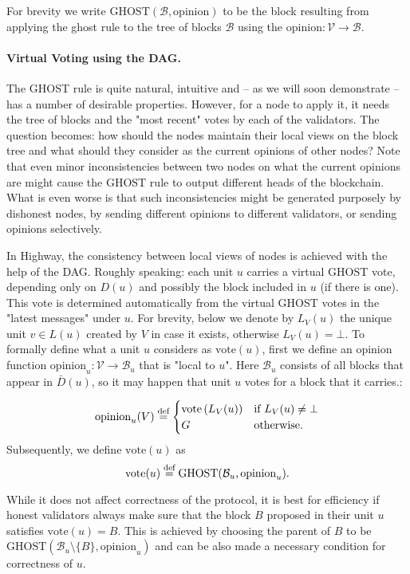 \documentclass[12pt, fleqn]{article}
\newcommand{\vote}{\mathrm{vote}}
\newcommand{\ghost}{\mathrm{GHOST}}
\newcommand{\opinion}{\mathrm{opinion}}
\newcommand{\defeq}{\stackrel{\textup{def}}{=}}
\newcommand{\cB}{\mathcal{B}}
\newcommand{\cV}{\mathcal{V}}
\newcommand{\inparen}[1]{\left(#1\right)}
\begin{document}
For brevity we write $\ghost(\cB, \opinion)$ to be the block resulting from applying the ghost rule to the tree of blocks $\cB$ using the $\opinion:\cV \to \cB$.

\paragraph{Virtual Voting using the DAG.}

The GHOST rule is quite natural, intuitive and -- as we will soon demonstrate -- has a number of desirable properties.
%
However, for a node to apply it, it needs the tree of blocks and the "most recent" votes by each of the validators. 
%
The question becomes: how should the nodes maintain their local views on the block tree and what should they consider as the current opinions of other nodes? 
%
Note that even minor inconsistencies between two nodes on what the current opinions are might cause the GHOST rule to output different heads of the blockchain.
%
What is even worse is that such inconsistencies might be generated purposely by dishonest nodes, by sending different opinions to different validators, or sending opinions selectively.

In Highway, the consistency between local views of nodes is achieved with the help of the DAG.
%
Roughly speaking: each unit $u$ carries a virtual GHOST vote, depending only on $D(u)$ and possibly the block included in $u$ (if there is one). This vote is determined automatically from the virtual GHOST votes in the "latest messages" under $u$.
%
For brevity, below we denote by $L_V(u)$ the unique unit $v\in L(u)$ created by $V$ in case it exists, otherwise $L_V(u)=\bot$.
%
To formally define what a unit $u$ considers as $\vote(u)$, first we define an opinion function $\opinion_u: \cV \to \cB_u$ that is "local to $u$". Here $\cB_u$ consists of all blocks that appear in $\bar{D}(u)$, so it may happen that unit $u$ votes for a block that it carries.:


$$
    \opinion_u(V) \defeq \begin{cases}
    \vote\inparen{L_V(u)} &\mbox{if }  L_V(u)\neq \bot\\
    G &\mbox{otherwise}.
    \end{cases}
$$
Subsequently, we define $\vote(u)$ as
$$\vote(u) \defeq \ghost(\cB_u, \opinion_u).$$

While it does not affect correctness of the protocol, it is best for efficiency if honest validators always make sure that the block $B$ proposed in their unit $u$ satisfies $\vote(u)=B$.
%
This is achieved by choosing the parent of $B$ to be $\ghost(\cB_u \setminus \{B\}, \opinion_u)$ and can be also made a necessary condition for correctness of $u$.
\end{document}
